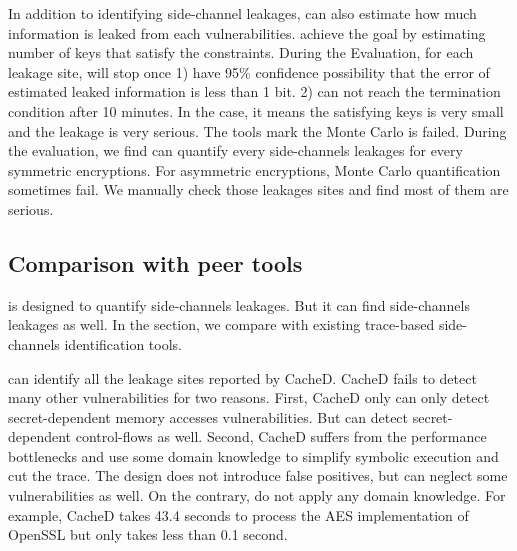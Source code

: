 In addition to identifying side-channel leakages, \tool{} can also estimate how
much information is leaked from each vulnerabilities. \tool{} achieve 
the goal by estimating number of keys that satisfy the constraints.
During the Evaluation, for each leakage site, 
\tool{} will stop once 1) have 95\% confidence 
possibility that the error of estimated leaked information is less than
1 bit. 2) can not reach the termination condition after 10 minutes. In 
the case, it means the satisfying keys is very small and the leakage is 
very serious. The tools mark the Monte Carlo is failed. During the 
evaluation, we find \tool{} can quantify every side-channels leakages 
for every symmetric encryptions. For asymmetric encryptions, Monte 
Carlo quantification sometimes fail. We manually check those leakages
sites and find most of them are serious.

\subsection{Comparison with peer tools}
\tool{} is designed to quantify side-channels leakages. But it can
find side-channels leakages as well. In the section, we compare 
\tool{} with existing trace-based side-channels identification 
tools.

\tool{} can identify all the leakage sites reported by CacheD.
CacheD fails to detect many other vulnerabilities for two
reasons. First, CacheD only can only detect secret-dependent
memory accesses vulnerabilities. But \tool{} can detect 
secret-dependent control-flows as well. Second, CacheD suffers
from the performance bottlenecks and use some domain knowledge 
to simplify symbolic execution and cut the trace. The design does 
not introduce false positives, but can neglect some vulnerabilities 
as well. On the contrary, \tool{} do not apply any domain knowledge.
For example, CacheD takes 43.4 seconds to process the AES implementation
of OpenSSL but \tool{} only takes less than 0.1 second.

